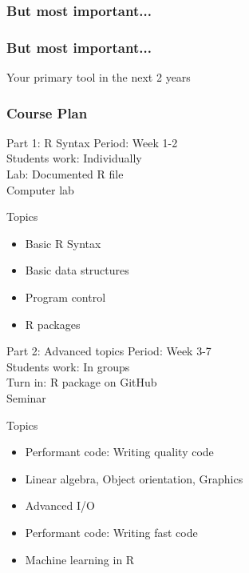 \documentclass{beamer}
\begin{document}
\begin{frame}
	\frametitle{But most important...}
\end{frame}

\begin{frame}
	\frametitle{But most important...}
	Your primary tool in the next 2 years
\end{frame}


\begin{frame}
\frametitle{Course Plan}
\begin{block}{Part 1: R Syntax}
Period: Week 1-2 \\
Students work: Individually \\
Lab: Documented R file \\
Computer lab \\
\end{block}
\begin{block}{Topics}
	\begin{itemize}
		\item Basic R Syntax
		\item Basic data structures
		\item Program control
		\item R packages
	\end{itemize}
\end{block}
\end{frame}

\begin{frame}
\begin{block}{Part 2: Advanced topics}
Period: Week 3-7 \\
Students work: In groups \\
Turn in: R package on GitHub \\
Seminar \\
\end{block}

\begin{block}{Topics}
	\begin{itemize}
		\item Performant code: Writing quality code
		\item Linear algebra, Object orientation, Graphics
		\item Advanced I/O
		\item Performant code: Writing fast code
		\item Machine learning in R
	\end{itemize}
\end{block}
\end{frame}
\end{document}
